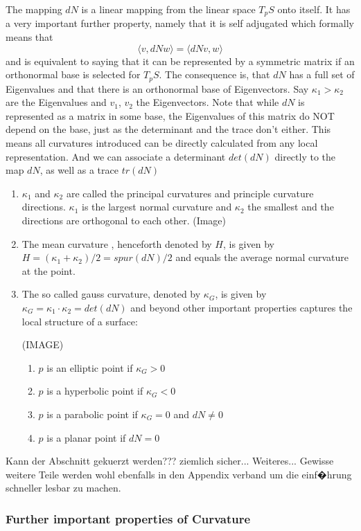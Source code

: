 The mapping $dN$ is a linear mapping from the linear space $T_pS$ onto itself. It has a very important further property, namely that it is self adjugated which formally means that
\[\langle v, dNw\rangle = \langle dN v, w \rangle\]
and is equivalent to saying that it can be represented by a symmetric matrix if an orthonormal base is selected for $T_pS$. The consequence is, that $dN$ has a full set of Eigenvalues and that there is an orthonormal base of Eigenvectors. Say $\kappa_1 > \kappa_2$ are the Eigenvalues and $v_1$, $v_2$ the Eigenvectors. Note that while $dN$ is represented as a matrix in some base, the Eigenvalues of this matrix do NOT depend on the base, just as the determinant and the trace don't either. This means all curvatures introduced can be directly calculated from any local representation. And we can associate a determinant $det (dN)$  directly to the map $dN$, as well as a trace $tr(dN)$
\begin{enumerate}
\item $\kappa_1$ and $\kappa_2$ are called the principal curvatures and principle curvature directions. $\kappa_1$ is the largest normal curvature and $\kappa_2$ the smallest and the directions are orthogonal to each other. (Image)
\item The mean curvature , henceforth denoted by $H$, is given by $H = (\kappa_1 + \kappa_2)/2 = spur(dN)/2$ and equals the average normal curvature at the point.
\item The so called gauss curvature, denoted by $\kappa_G$, is given by $\kappa_G = \kappa_1 \cdot \kappa_2 = det(dN)$ and beyond other important properties captures the local structure of a surface:

(IMAGE)
 
\begin{enumerate}
\item $p$ is an elliptic point if $\kappa_G >0$
\item $p$ is a hyperbolic point if $\kappa_G <0$
\item $p$ is a parabolic point if $\kappa_G =0$ and $dN \neq 0$
\item $p$ is a planar point if $dN =0$
\end{enumerate}
\end{enumerate}

Kann der Abschnitt gekuerzt werden??? ziemlich sicher...
Weiteres... Gewisse weitere Teile werden wohl ebenfalls in den Appendix verband um die einf�hrung schneller lesbar zu machen.

\subsubsection*{Further important properties of Curvature}

